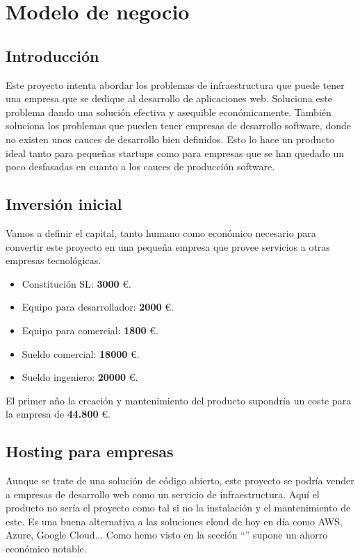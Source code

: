 \chapter {Modelo de negocio}

\section{Introducción}
        \begin{text}
                Este proyecto intenta abordar los problemas de infraestructura que puede tener una empresa que se dedique al desarrollo de aplicaciones web. Soluciona este problema dando una solución efectiva y asequible económicamente. También soluciona los problemas que pueden tener empresas de desarrollo software, donde no existen unos cauces de desarrollo bien definidos. Esto lo hace un producto ideal tanto para pequeñas startups como para empresas que se han quedado un poco desfasadas en cuanto a los cauces de producción software.
        \end{text}

\section{Inversión inicial}
        \begin{text}
                Vamos a definir el capital, tanto humano como económico necesario para convertir este proyecto en una pequeña empresa que provee servicios a otras empresas tecnológicas.

                \begin{itemize}
                        \item Constitución SL: \textbf{3000} \euro.
                        \item Equipo para desarrollador: \textbf{2000} \euro.
                        \item Equipo para comercial: \textbf{1800} \euro.
                        \item Sueldo comercial: \textbf{18000} \euro.
                        \item Sueldo ingeniero: \textbf{20000} \euro.
                \end{itemize}

                El primer año la creación y mantenimiento del producto supondría un coste para la empresa de \textbf{44.800} \euro.
        \end{text}

\section{Hosting para empresas}
        \begin{text}
        		Aunque se trate de una solución de código abierto, este proyecto se podría vender a empresas de desarrollo web como un servicio de infraestructura. Aquí el producto no sería el proyecto como tal si no la instalación y el mantenimiento de este. Es una buena alternativa a las soluciones cloud de hoy en día como AWS, Azure, Google Cloud... Como hemo visto en la sección ``'' supone un ahorro económico notable.
        \end{text}

